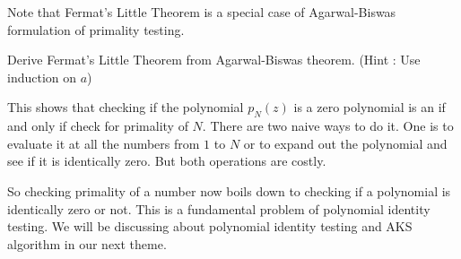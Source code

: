 Note that Fermat's Little Theorem is a special case of Agarwal-Biswas
formulation of primality testing.
\begin{exercise}
Derive Fermat's Little Theorem from Agarwal-Biswas theorem. (Hint : Use
induction on $a$)
\end{exercise}

This shows that checking if the polynomial $p_N(z)$ is a zero polynomial is an
if and only if check for primality of $N$. There are two naive ways to do it.
One is to evaluate it at all the numbers from $1$ to $N$ or to expand out the
polynomial and see if it is identically zero. But both operations are costly.

So checking primality of a number now boils down to checking if a polynomial
is identically zero or not. This is a fundamental problem of polynomial
identity testing. We will be discussing about polynomial identity testing and 
AKS algorithm in our next theme.
